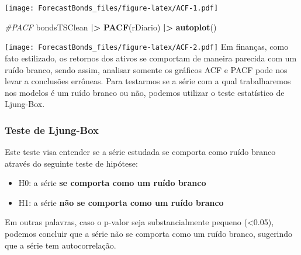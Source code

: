 \documentclass[
]{article}
\newenvironment{Shaded}{\begin{snugshade}}{\end{snugshade}}
\newcommand{\CommentTok}[1]{\textcolor[rgb]{0.56,0.35,0.01}{\textit{#1}}}
\newcommand{\FunctionTok}[1]{\textcolor[rgb]{0.13,0.29,0.53}{\textbf{#1}}}
\newcommand{\NormalTok}[1]{#1}
\newcommand{\SpecialCharTok}[1]{\textcolor[rgb]{0.81,0.36,0.00}{\textbf{#1}}}
\providecommand{\tightlist}{%
  \setlength{\itemsep}{0pt}\setlength{\parskip}{0pt}}
\begin{document}
\texttt{[image: ForecastBonds\_files/figure-latex/ACF-1.pdf]}

\begin{Shaded}
\begin{Highlighting}[]
\CommentTok{\#PACF}
\NormalTok{bondsTSClean }\SpecialCharTok{|\textgreater{}} \FunctionTok{PACF}\NormalTok{(rDiario) }\SpecialCharTok{|\textgreater{}} \FunctionTok{autoplot}\NormalTok{()}
\end{Highlighting}
\end{Shaded}

\texttt{[image: ForecastBonds\_files/figure-latex/ACF-2.pdf]} Em
finanças, como fato estilizado, os retornos dos ativos se comportam de
maneira parecida com um ruído branco, sendo assim, analisar somente os
gráficos ACF e PACF pode nos levar a conclusões errôneas. Para testarmos
se a série com a qual trabalharemos nos modelos é um ruído branco ou
não, podemos utilizar o teste estatístico de Ljung-Box.

\hypertarget{teste-de-ljung-box}{%
\subsubsection{Teste de Ljung-Box}\label{teste-de-ljung-box}}

Este teste visa entender se a série estudada se comporta como ruído
branco através do seguinte teste de hipótese:

\begin{itemize}
\tightlist
\item
  H0: a série \textbf{se comporta como um ruído branco}
\item
  H1: a série \textbf{não se comporta como um ruído branco}
\end{itemize}

Em outras palavras, caso o p-valor seja substancialmente pequeno
(\textless0.05), podemos concluir que a série não se comporta como um
ruído branco, sugerindo que a série tem autocorrelação.
\end{document}
